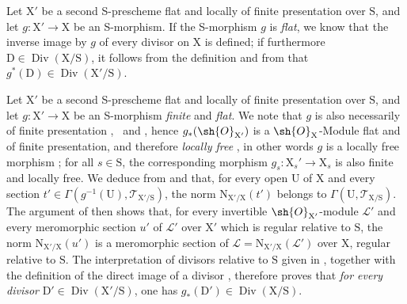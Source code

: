 \begin{env}[21.15.7]
\label{IV.21.15.7}
Let $\mathrm{X}'$ be a second S-prescheme flat and locally of finite presentation over $\mathrm{S}$, and let $g:\mathrm{X}'\to\mathrm{X}$ be an S-morphism.
If the S-morphism $g$ is \emph{flat}, we know  that the inverse image by $g$ of every divisor on $\mathrm{X}$ is defined; if furthermore $\mathrm{D}\in\operatorname{Div}(\mathrm{X}/\mathrm{S})$, it follows from the definition  and from  that $g^*(\mathrm{D})\in\operatorname{Div}(\mathrm{X}'/\mathrm{S})$.
\end{env}

\begin{env}[21.15.8]
\label{IV.21.15.8}
Let $\mathrm{X}'$ be a second S-prescheme flat and locally of finite presentation over $\mathrm{S}$, and let $g:\mathrm{X}'\to\mathrm{X}$ be an S-morphism \emph{finite} and \emph{flat}.
We note that $g$ is also necessarily of finite presentation ,~ and , hence $g_*(\sh{O}_{\mathrm{X}'})$ is a $\sh{O}_{\mathrm{X}}$-Module flat and of finite presentation, and therefore \emph{locally free} , in other words $g$ is a locally free morphism ; for all $s\in\mathrm{S}$, the corresponding morphism $g_s:\mathrm{X}_s'\to\mathrm{X}_s$ is also finite and locally free.
We deduce from  and  that, for every open $\mathrm{U}$ of $\mathrm{X}$ and every section $t'\in\Gamma(g^{-1}(\mathrm{U}),\mathscr{T}_{\mathrm{X}'/\mathrm{S}})$, the norm $\mathrm{N}_{\mathrm{X}'/\mathrm{X}}(t')$ belongs to $\Gamma(\mathrm{U},\mathscr{T}_{\mathrm{X}/\mathrm{S}})$. The argument of  then shows that, for every invertible $\sh{O}_{\mathrm{X}'}$-module $\mathscr{L}'$ and every meromorphic section $u'$ of $\mathscr{L}'$ over $\mathrm{X}'$ which is regular relative to $\mathrm{S}$, the norm $\mathrm{N}_{\mathrm{X}'/\mathrm{X}}(u')$ is a meromorphic section of $\mathscr{L}=\mathrm{N}_{\mathrm{X}'/\mathrm{X}}(\mathscr{L}')$ over $\mathrm{X}$, regular relative to $\mathrm{S}$.
The interpretation of divisors relative to $\mathrm{S}$ given in , together with the definition of the direct image of a divisor , therefore proves that \emph{for every divisor} $\mathrm{D}'\in\operatorname{Div}(\mathrm{X}'/\mathrm{S})$, one has $g_*(\mathrm{D}')\in\operatorname{Div}(\mathrm{X}/\mathrm{S})$.
\end{env}


